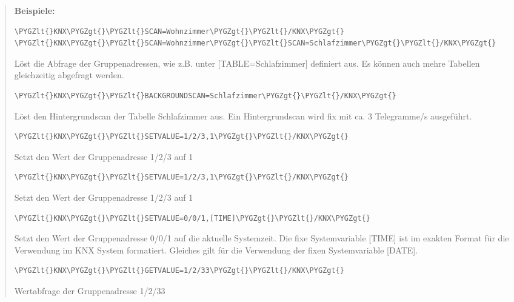 \documentclass[letterpaper,10pt,english]{sphinxmanual}
\def\PYGZlt{\char`\<}
\def\PYGZgt{\char`\>}
\begin{document}
\begin{DUlineblock}{0em}
\item[] 
\end{DUlineblock}
\begin{quote}

\textbf{Beispiele:}

\begin{Verbatim}[commandchars=\\\{\}]
\PYGZlt{}KNX\PYGZgt{}\PYGZlt{}SCAN=Wohnzimmer\PYGZgt{}\PYGZlt{}/KNX\PYGZgt{}
\PYGZlt{}KNX\PYGZgt{}\PYGZlt{}SCAN=Wohnzimmer\PYGZgt{}\PYGZlt{}SCAN=Schlafzimmer\PYGZgt{}\PYGZlt{}/KNX\PYGZgt{}
\end{Verbatim}

Löst die Abfrage der Gruppenadressen, wie z.B. unter {[}TABLE=Schlafzimmer{]} definiert aus. Es können auch mehre Tabellen gleichzeitig abgefragt werden.

\begin{Verbatim}[commandchars=\\\{\}]
\PYGZlt{}KNX\PYGZgt{}\PYGZlt{}BACKGROUNDSCAN=Schlafzimmer\PYGZgt{}\PYGZlt{}/KNX\PYGZgt{}
\end{Verbatim}

Löst den Hintergrundscan der Tabelle Schlafzimmer aus. Ein Hintergrundscan wird fix mit ca. 3 Telegramme/s ausgeführt.

\begin{Verbatim}[commandchars=\\\{\}]
\PYGZlt{}KNX\PYGZgt{}\PYGZlt{}SETVALUE=1/2/3,1\PYGZgt{}\PYGZlt{}/KNX\PYGZgt{}
\end{Verbatim}

Setzt den Wert der Gruppenadresse 1/2/3 auf 1

\begin{Verbatim}[commandchars=\\\{\}]
\PYGZlt{}KNX\PYGZgt{}\PYGZlt{}SETVALUE=1/2/3,1\PYGZgt{}\PYGZlt{}/KNX\PYGZgt{}
\end{Verbatim}

Setzt den Wert der Gruppenadresse 1/2/3 auf 1

\begin{Verbatim}[commandchars=\\\{\}]
\PYGZlt{}KNX\PYGZgt{}\PYGZlt{}SETVALUE=0/0/1,[TIME]\PYGZgt{}\PYGZlt{}/KNX\PYGZgt{}
\end{Verbatim}

Setzt den Wert der Gruppenadresse 0/0/1 auf die aktuelle Systemzeit. Die fixe Systemvariable {[}TIME{]} ist im exakten Format für die Verwendung im KNX System formatiert. Gleiches gilt für die Verwendung der fixen Systemvariable {[}DATE{]}.

\begin{Verbatim}[commandchars=\\\{\}]
\PYGZlt{}KNX\PYGZgt{}\PYGZlt{}GETVALUE=1/2/33\PYGZgt{}\PYGZlt{}/KNX\PYGZgt{}
\end{Verbatim}

Wertabfrage der Gruppenadresse 1/2/33
\end{quote}
\end{document}
